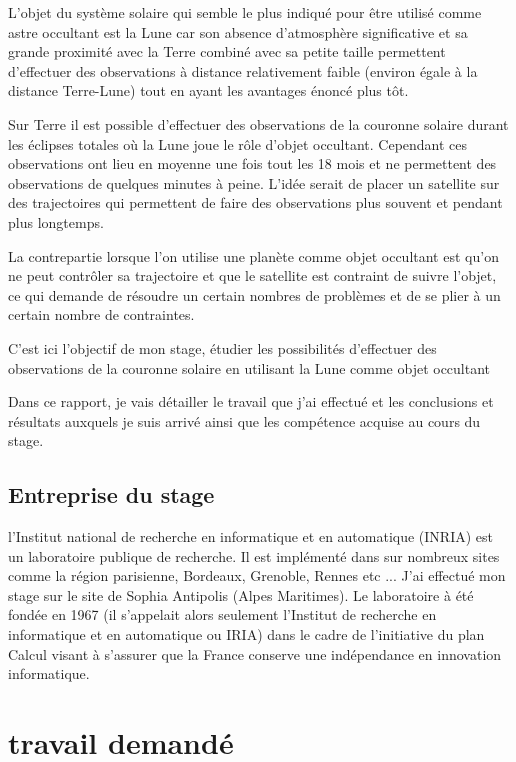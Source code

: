 \documentclass[12pt]{article} %
\begin{document}
		L'objet du système solaire qui semble le plus indiqué pour être utilisé comme astre occultant est la Lune car son absence d'atmosphère significative et sa grande proximité avec la Terre combiné avec sa petite taille permettent d'effectuer des observations à distance relativement faible (environ égale à la distance Terre-Lune) tout en ayant les avantages énoncé plus tôt.
		
		Sur Terre il est possible d'effectuer des observations de la couronne solaire durant les éclipses totales où la Lune joue le rôle d'objet occultant. Cependant ces observations ont lieu en moyenne une fois tout les 18 mois et ne permettent des observations de quelques minutes à peine. L'idée serait de placer un satellite sur des trajectoires qui permettent de faire des observations plus souvent et pendant plus longtemps. 
		 
		La contrepartie lorsque l'on utilise une planète comme objet occultant est qu'on ne peut contrôler sa trajectoire et que le satellite est contraint de suivre l'objet, ce qui demande de résoudre un certain nombres de problèmes et de se plier à un certain nombre de contraintes.
		
		C'est ici l'objectif de mon stage, étudier les possibilités d'effectuer des observations de la couronne solaire en utilisant la Lune comme objet occultant
		 
		Dans ce rapport, je vais détailler le travail que j'ai effectué et les conclusions et résultats auxquels je suis arrivé ainsi que les compétence acquise au cours du stage. 
		 
		\subsection{Entreprise du stage}
		
		l'Institut national de recherche en informatique et en automatique (INRIA) est un laboratoire publique de recherche. Il est implémenté dans sur nombreux sites comme la région parisienne, Bordeaux, Grenoble, Rennes etc ... J'ai effectué mon stage sur le site de Sophia Antipolis (Alpes Maritimes). Le laboratoire à été fondée en 1967 (il s'appelait alors seulement l'Institut de recherche en informatique et en automatique ou IRIA) dans le cadre de l'initiative du plan Calcul visant à s'assurer que la France conserve une indépendance en innovation informatique.
		
		
		\newpage
		\section{travail demandé}
\end{document}

